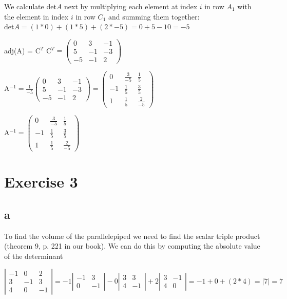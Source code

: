 \documentclass{article}
\begin{document}
We calculate det$A$ next by multiplying each element at index $i$ in row $A_{1}$ with the element in index $i$ in row $C_{1}$ and summing them together:\\
det$A = (1*0) + (1*5) + (2*-5) = 0 + 5 - 10 = -5$

adj(A) = C$^{T}$
C$^{T}=
\left (
    \begin{matrix}
        0 & 3 & -1\\
        5 & -1 & -3\\
        -5 & -1 & 2
    \end{matrix}
\right )
$

A$^{-1} = \frac{1}{-5}
\left (
    \begin{matrix}
        0 & 3 & -1\\
        5 & -1 & -3\\
        -5 & -1 & 2
    \end{matrix}
\right )       
=
\left (
    \begin{matrix}
        0 & \frac{3}{-5} & \frac{1}{5}\\
        -1 & \frac{1}{5} & \frac{3}{5}\\
        1 & \frac{1}{5} & \frac{2}{-5}
    \end{matrix}
\right )
$

A$^{-1} =
\left (
    \begin{matrix}
        0 & \frac{3}{-5} & \frac{1}{5}\\
        -1 & \frac{1}{5} & \frac{3}{5}\\
        1 & \frac{1}{5} & \frac{2}{-5}
    \end{matrix}
\right )
$
\newpage

\section*{Exercise 3}

\subsection*{a}

To find the volume of the parallelepiped we need to find the scalar triple product (theorem 9, p. 221 in our book). We can do this by computing the absolute value of the determinant

$
\left |
    \begin{matrix}
        -1 & 0 & 2\\
        3 & -1 & 3\\
        4 & 0 & -1
    \end{matrix}
\right |
=-1
\left |
    \begin{matrix}
        -1 & 3\\
        0 & -1
    \end{matrix}
\right |
-0
\left |
    \begin{matrix}
        3 & 3\\
        4 & -1
    \end{matrix}
\right |
+2
\left |
    \begin{matrix}
        3 & -1\\
        4 & 0
    \end{matrix}
\right |
=
-1 + 0 + (2*4)
=
|7| = 7
$
\end{document}
